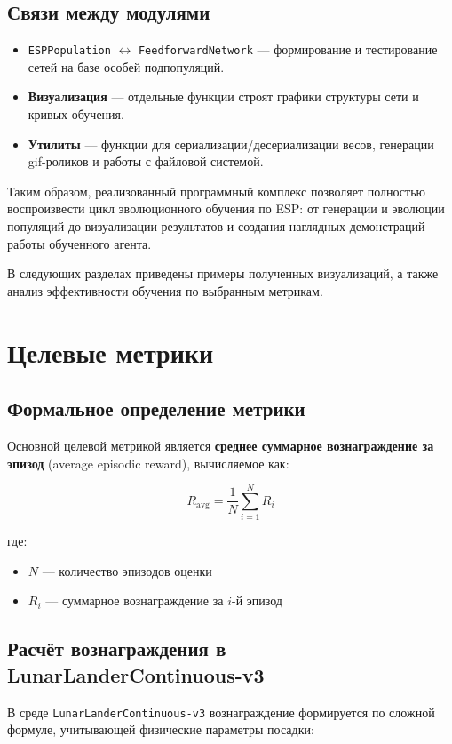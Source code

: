 \documentclass[a4paper,12pt]{article}
\begin{document}
\subsection{Связи между модулями}

\begin{itemize}
	\item \texttt{ESPPopulation} $\leftrightarrow$ \texttt{FeedforwardNetwork} --- формирование и тестирование сетей на базе особей подпопуляций.
	\item \textbf{Визуализация} --- отдельные функции строят графики структуры сети и кривых обучения.
	\item \textbf{Утилиты} --- функции для сериализации/десериализации весов, генерации gif-роликов и работы с файловой системой.
\end{itemize}

Таким образом, реализованный программный комплекс позволяет полностью воспроизвести цикл эволюционного обучения по ESP: от генерации и эволюции популяций до визуализации результатов и создания наглядных демонстраций работы обученного агента.

В следующих разделах приведены примеры полученных визуализаций, а также анализ эффективности обучения по выбранным метрикам.
\newpage
\section{Целевые метрики}

\subsection{Формальное определение метрики}
Основной целевой метрикой является \textbf{среднее суммарное вознаграждение за эпизод} (average episodic reward), вычисляемое как:

\[
R_{\text{avg}} = \frac{1}{N} \sum_{i=1}^{N} R_i
\]

где:
\begin{itemize}
	\item $N$ — количество эпизодов оценки
	\item $R_i$ — суммарное вознаграждение за $i$-й эпизод
\end{itemize}

\subsection{Расчёт вознаграждения в LunarLanderContinuous-v3}
В среде \texttt{LunarLanderContinuous-v3} вознаграждение формируется по сложной формуле, учитывающей физические параметры посадки:
\end{document}
